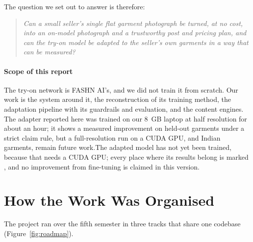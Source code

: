 \noindent The question we set out to answer is therefore:

\begin{quote}\itshape
Can a small seller's single flat garment photograph be turned, at no cost, into an on-model photograph and a trustworthy post and pricing plan, and can the try-on model be adapted to the seller's own garments in a way that can be measured?
\end{quote}

\paragraph{Scope of this report} The try-on network is FASHN AI's, and we did not train it from scratch. Our work is the system around it, the reconstruction of its training method, the adaptation pipeline with its guardrails and evaluation, and the content engines. \ifLora The adapter reported here was trained on our 8~GB laptop at half resolution for about an hour; it shows a measured improvement on held-out garments under a strict claim rule, but a full-resolution run on a CUDA GPU, and Indian garments, remain future work.\else The adapted model has not yet been trained, because that needs a CUDA GPU; every place where its results belong is marked \pending{}, and no improvement from fine-tuning is claimed in this version.\fi

\section{How the Work Was Organised}

The project ran over the fifth semester in three tracks that share one codebase (Figure~\ref{fig:roadmap}).

